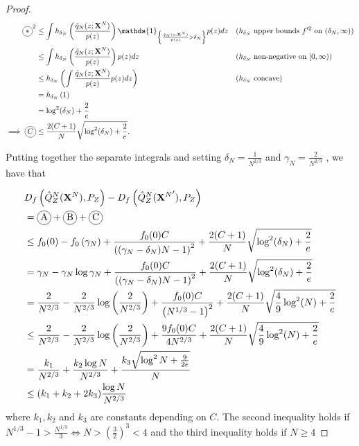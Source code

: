 \begin{proof}
\begin{align*}
    \encircle{$*$}^2
    &\leq \int h_{\delta_N}\left(\frac{\hat{q}_N(z;\XN)}{p(z)} \right) \mathds{1}_{\left\lbrace \frac{\hat{q}_N(z;\XN)}{p(z)} > \delta_N \right\rbrace} p(z) dz
    && \text{($h_{\delta_N}$ upper bounds $f'^2$ on $(\delta_N, \infty)$)}
    \\
    &\leq \int h_{\delta_N}\left(\frac{\hat{q}_N(z;\XN)}{p(z)} \right) p(z) dz
    && \text{($h_{\delta_N}$ non-negative on $[0, \infty)$)}
    \\
    &\leq  h_{\delta_N}\left( \int \frac{\hat{q}_N(z;\XN)}{p(z)} p(z) dz \right) 
    && \text{($h_{\delta_N}$ concave)}
    \\
    &= h_{\delta_N}\left( 1\right) \\
    &= \log^2(\delta_N) + \frac{2}{e}\\
    \implies \encircle{$C$} &\leq \frac{2(C+1)}{N}\sqrt{\log^2(\delta_N) + \frac{2}{e}}.
\end{align*}


Putting together the separate integrals and setting $\delta_N = \frac{1}{N^{2/3}}$ and $\gamma_N = \frac{2}{N^{2/3}}$ , we have that

\begin{align*}
    &D_f\left( \hat{Q}_Z^N(\XN) , P_Z\right) - D_f\left( \hat{Q}_Z^N({\XN}') , P_Z\right) \\
    &= \encircle{A} + \encircle{B} + \encircle{C} \\
    &\leq f_0(0) - f_0\left(\gamma_N\right) +  \frac{f_0(0)C}{\left((\gamma_N-\delta_N)N - 1\right)^2} + \frac{2(C+1)}{N} \sqrt{\log^2(\delta_N) + \frac{2}{e} } \\
    &= \gamma_N - \gamma_N \log \gamma_N + \frac{f_0(0)C}{\left((\gamma_N-\delta_N)N - 1\right)^2} + \frac{2(C+1)}{N}  \sqrt{\log^2(\delta_N) + \frac{2}{e}}\\
    &=\frac{2}{N^{2/3}} - \frac{2}{N^{2/3}} \log\left(\frac{2}{N^{2/3}} \right) + \frac{f_0(0)C}{\left(N^{1/3} - 1\right)^2} + \frac{2(C+1)}{N} \sqrt{\frac{4}{9}\log^2(N) + \frac{2}{e}} 
    \\
    &\leq\frac{2}{N^{2/3}} - \frac{2}{N^{2/3}} \log\left(\frac{2}{N^{2/3}} \right) + \frac{9f_0(0)C}{4N^{2/3}} + \frac{2(C+1)}{N} \sqrt{\frac{4}{9}\log^2(N) + \frac{2}{e}} 
    \\
    &= \frac{k_1}{N^{2/3}} + \frac{k_2 \log N}{N^{2/3}} + \frac{k_3 \sqrt{\log^2N + \frac{9}{2e}}}{N}\\
    &\leq (k_1+k_2+2k_3)\frac{\log N}{N^{2/3}}
\end{align*}
where $k_1, k_2$ and $k_3$ are constants depending on $C$.
The second inequality holds if $N^{1/3}-1 > \frac{N^{1/3}}{3} \iff N>\left(\frac{3}{2}\right)^3 < 4$ and the third inequality holds if $N\geq 4$


\end{proof}
